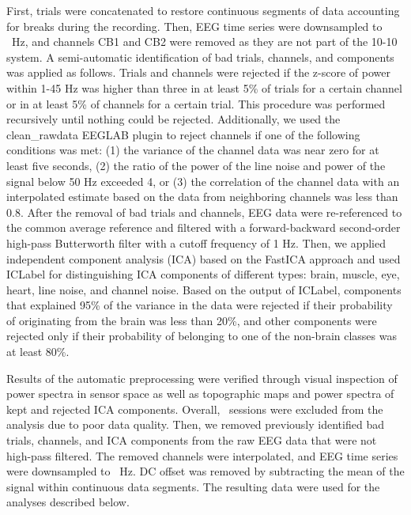 First, trials were concatenated to restore continuous segments of data accounting for breaks during the recording. Then, EEG time series were downsampled to \downsampleFreq~Hz, and channels CB1 and CB2 were removed as they are not part of the 10-10 system. A semi-automatic identification of bad trials, channels, and components was applied as follows. Trials and channels were rejected if the z-score of power within 1-45 Hz was higher than three in at least 5\% of trials for a certain channel or in at least 5\% of channels for a certain trial. This procedure was performed recursively until nothing could be rejected. Additionally, we used the clean\_rawdata EEGLAB plugin to reject channels if one of the following conditions was met: (1) the variance of the channel data was near zero for at least five seconds, (2) the ratio of the power of the line noise and power of the signal below 50 Hz exceeded 4, or (3) the correlation of the channel data with an interpolated estimate based on the data from neighboring channels was less than 0.8. After the removal of bad trials and channels, EEG data were re-referenced to the common average reference and filtered with a forward-backward second-order high-pass Butterworth filter with a cutoff frequency of 1 Hz. Then, we applied independent component analysis (ICA) based on the FastICA approach \citep{FastICA_Hyvaerinen1999} and used ICLabel \citep{ICLabel_PionTonachini2019} for distinguishing ICA components of different types: brain, muscle, eye, heart, line noise, and channel noise. Based on the output of ICLabel, components that explained 95\% of the variance in the data were rejected if their probability of originating from the brain was less than 20\%, and other components were rejected only if their probability of belonging to one of the non-brain classes was at least 80\%.

\medskip

Results of the automatic preprocessing were verified through visual inspection of power spectra in sensor space as well as topographic maps and power spectra of kept and rejected ICA components. Overall, \numSessionsExcluded~sessions were excluded from the analysis due to poor data quality. Then, we removed previously identified bad trials, channels, and ICA components from the raw EEG data that were not high-pass filtered. The removed channels were interpolated, and EEG time series were downsampled to \downsampleFreq~Hz. DC offset was removed by subtracting the mean of the signal within continuous data segments. The resulting data were used for the analyses described below.

